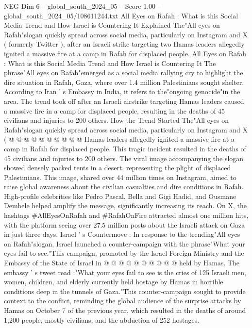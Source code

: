 \begin{textsample}{NEG Dim 6 – global\_south\_2024\_05 – Score 1.00 – global\_south\_2024\_05/108611244.txt}  \label{ex:f6_neg_295}
All Eyes on Rafah : What is this Social Media Trend and How Israel is Countering It Explained The"All eyes on Rafah"slogan quickly spread across social media, particularly on Instagram and X ( formerly Twitter ), after an Israeli strike targeting two Hamas leaders allegedly ignited a massive fire at a camp in Rafah for displaced people.
All Eyes on Rafah : What is this Social Media Trend and How Israel is Countering It The phrase"All eyes on Rafah"emerged as a social media rallying cry to highlight the dire situation in Rafah, Gaza, where over 1.4 million Palestinians sought shelter.
According to Iran ' s Embassy in India, it refers to the"ongoing genocide"in the area.
The trend took off after an Israeli airstrike targeting Hamas leaders caused a massive fire in a camp for displaced people, resulting in the deaths of 45 civilians and injuries to 200 others.
How the Trend Started The"All eyes on Rafah"slogan quickly spread across social media, particularly on Instagram and X ( @ @ @ @ @ @ @ @ @ @ Hamas leaders allegedly ignited a massive fire at a camp in Rafah for displaced people.
This tragic incident resulted in the deaths of 45 civilians and injuries to 200 others.
The viral image accompanying the slogan showed densely packed tents in a desert, representing the plight of displaced Palestinians.
This image, shared over 44 million times on Instagram, aimed to raise global awareness about the civilian casualties and dire conditions in Rafah.
High-profile celebrities like Pedro Pascal, Bella and Gigi Hadid, and Ousmane Dembele helped amplify the message, significantly increasing its reach.
On X, the hashtags \#AllEyesOnRafah and \#RafahOnFire attracted almost one million hits, with the platform seeing over 27.5 million posts about the Israeli attack on Gaza in just three days.
Israel ' s Countermove : In response to the trending"All eyes on Rafah"slogan, Israel launched a counter-campaign with the phrase"What your eyes fail to see."This campaign, promoted by the Israel Foreign Ministry and the Embassy of the State of Israel in @ @ @ @ @ @ @ @ @ @ held by Hamas.
The embassy ' s tweet read :"What your eyes fail to see is the cries of 125 Israeli men, women, children, and elderly currently held hostage by Hamas in horrible conditions deep in the tunnels of Gaza."This counter-campaign sought to provide context to the conflict, reminding the global audience of the surprise attacks by Hamas on October 7 of the previous year, which resulted in the deaths of around 1,200 people, mostly civilians, and the abduction of 252 hostages.

\end{textsample}
